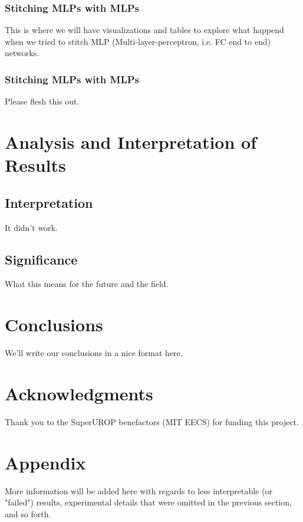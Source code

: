 \documentclass{article} %
\begin{document}
\subsubsection{Stitching MLPs with MLPs}
This is where we will have visualizations and tables to explore what happend
when we tried to stitch MLP (Multi-layer-perceptron, i.e. FC end to end) networks.

\subsubsection{Stitching MLPs with MLPs}
Please flesh this out.

\section{Analysis and Interpretation of Results}
\subsection{Interpretation}
It didn't work.

\subsection{Significance}
What this means for the future and the field.

\section{Conclusions}
We'll write our conclusions in a nice format here.

\section*{Acknowledgments}
Thank you to the SuperUROP benefactors (MIT EECS) for funding this project.




\appendix
\section{Appendix}
More information will be added here with regards to less interpretable (or "failed")
results, experimental details that were omitted in the previous section, and so forth.
\end{document}
